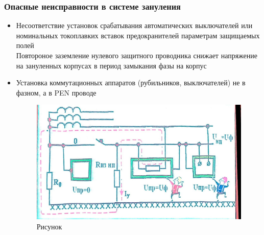 \documentclass[a4paper, 14pt]{extarticle}
\begin{document}
\subsubsection*{Опасные неисправности в системе зануления}
\begin{itemize}
    \item Несоответствие установок срабатывания автоматических выключателей или номинальных токоплавких вставок предокранителей параметрам защищаемых полей\\
    Повтороное заземление нулевого защитного проводника снижает напряжение на зануленных корпусах в период замыкания фазы на корпус
    \item Установка коммутационных аппаратов (рубильников, выключателей) не в фазном, а в PEN проводе
    \begin{figure}[h]
        \centering
        \includegraphics[width=\textwidth]{./img/L5/S001.jpg}
        \caption{Рисунок}
    \end{figure}
    

\end{itemize}
\end{document}
